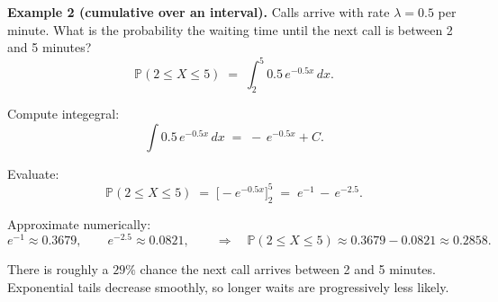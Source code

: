 \documentclass{book}
\begin{document}
\medskip

\textbf{Example 2 (cumulative over an interval).} Calls arrive with rate $\lambda=0.5$ per minute. What is the probability the waiting time until the next call is between 2 and 5 minutes?
\begin{equation}
\mathbb{P}(2 \le X \le 5) \;=\; \int_{2}^{5} 0.5\, e^{-0.5x} \, dx.
\end{equation}

Compute integegral:
\begin{equation}
	\int 0.5\, e^{-0.5x} \, dx \;=\; -\, e^{-0.5x} + C.
\end{equation}

Evaluate:
\begin{equation}
	\mathbb{P}(2 \le X \le 5) \;=\; \big[-e^{-0.5x}\big]_{2}^{5} \;=\; e^{-1} \,-\, e^{-2.5}.
\end{equation}

Approximate numerically:
\begin{equation}
	e^{-1} \approx 0.3679, \qquad
	e^{-2.5} \approx 0.0821, \qquad
	\Rightarrow \quad \mathbb{P}(2 \le X \le 5) \approx 0.3679 - 0.0821 \approx 0.2858.
\end{equation}

There is roughly a $29\%$ chance the next call arrives between 2 and 5 minutes. Exponential tails decrease smoothly, so longer waits are progressively less likely.
\end{document}
